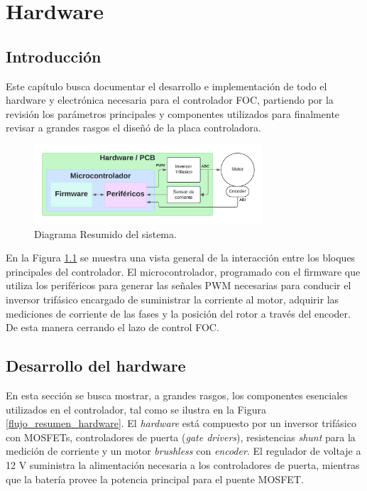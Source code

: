 \documentclass[11pt]{report}
\begin{document}
\chapter{Hardware}
\section{Introducción}
Este capítulo busca documentar el desarrollo e implementación de todo el hardware y electrónica necesaria para el controlador FOC, partiendo por la revisión los parámetros principales y componentes utilizados para finalmente revisar a grandes rasgos el diseñó de la placa controladora.


\begin{figure}[ht]
	\centering
	\includegraphics[width=0.76\textwidth]{imagenes/Diagramas/Diagramas - ultra resumen.png}
	\caption{Diagrama Resumido del sistema.}
	\label{flujo_resumen}
\end{figure}
\FloatBarrier

En la Figura \ref{flujo_resumen} se muestra una vista general de la interacción entre los bloques principales del controlador. El microcontrolador, programado con el firmware que utiliza los periféricos para generar las señales PWM necesarias para conducir el inversor trifásico encargado de suministrar la corriente al motor, adquirir las mediciones de corriente de las fases y la posición del rotor a través del encoder. De esta manera cerrando el lazo de control FOC.

\newpage
\section{Desarrollo del hardware}
En esta sección se busca mostrar, a grandes rasgos, los componentes esenciales utilizados en el controlador, tal como se ilustra en la Figura \ref{flujo_resumen_hardware}. El \emph{hardware} está compuesto por un inversor trifásico con MOSFETs, controladores de puerta (\emph{gate drivers}), resistencias \emph{shunt} para la medición de corriente y un motor \emph{brushless} con \emph{encoder}. El regulador de voltaje a 12 V suministra la alimentación necesaria a los controladores de puerta, mientras que la batería provee la potencia principal para el puente MOSFET.
\end{document}
